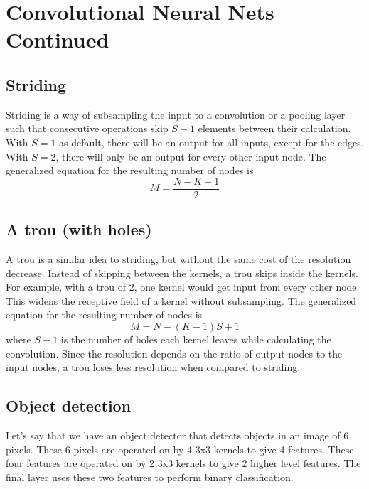 \chapter{Convolutional Neural Nets Continued}

\section{Striding}
Striding is a way of subsampling the input to a convolution or a pooling layer such that consecutive operations skip $S-1$ elements between their calculation.
With $S=1$ as default, there will be an output for all inputs, except for the edges.
With $S=2$, there will only be an output for every other input node.
The generalized equation for the resulting number of nodes is
\begin{equation}
    M = \frac{N - K + 1}{2}
\end{equation}

\section{A trou (with holes)}
A trou is a similar idea to striding, but without the same cost of the resolution decrease.
Instead of skipping between the kernels, a trou skips inside the kernels.
For example, with a trou of 2, one kernel would get input from every other node.
This widens the receptive field of a kernel without subsampling.
The generalized equation for the resulting number of nodes is
\begin{equation}
    M = N - (K-1)S + 1
\end{equation}
where $S-1$ is the number of holes each kernel leaves while calculating the convolution.
Since the resolution depends on the ratio of output nodes to the input nodes, a trou loses less resolution when compared to striding.

\section{Object detection}
Let's say that we have an object detector that detects objects in an image of 6 pixels.
These 6 pixels are operated on by 4 3x3 kernels to give 4 features.
These four features are operated on by 2 3x3 kernels to give 2 higher level features.
The final layer uses these two features to perform binary classification.

